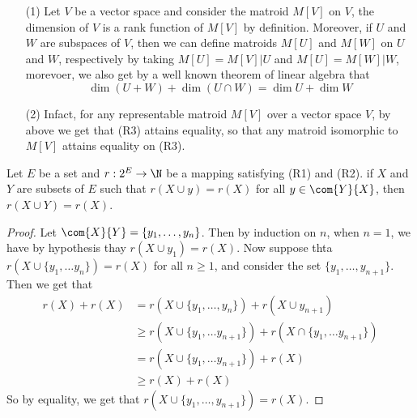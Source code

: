 \begin{example}\label{1.11}
    \begin{enumerate}
        \item[(1)] Let $V$ be a vector space and consider the matroid $M[V]$ on
            $V$, the dimension of $V$ is a rank function of $M[V]$ by definition.
            Moreover, if $U$ and  $W$ are subspaces of  $V$, then we can define
            matroids  $M[U]$ and $M[W]$ on $U$ and  $W$, respectively by taking
            $M[U]=M[V]|U$ and $M[U]=M[W]|W$, morevoer, we also get by a well
            known theorem of linear algebra that
                \begin{equation*}
                    \dim{(U+W)}+\dim{(U \cap W)}=\dim{U}+\dim{W}
                \end{equation*}

            \item[(2)] Infact, for any representable matroid $M[V]$ over a
                vector space $V$, by above we get that (R3) attains equality, so
                that any matroid isomorphic to $M[V]$ attains equality on (R3).
    \end{enumerate}
\end{example}

\begin{lemma}\label{1.3.2}
    Let $E$ be a set and  $r:2^E \rightarrow \N$ be a mapping satisfying (R1)
    and (R2). if $X$ and  $Y$ are subsets of  $E$ such that  $r(X \cup y)=r(X)$
    for all $y \in \com{Y}{X}$, then $r(X \cup Y)=r(X)$.
\end{lemma}
\begin{proof}
    Let $\com{X}{Y}=\{y_1, \dots, y_n\}$. Then by induction on $n$, when  $n=1$,
    we have by hypothesis thay  $r(X \cup y_1)=r(X)$. Now suppose thta $r(X \cup
    \{y_1, \dots y_n\})=r(X)$ for all $n \geq 1$, and consider the set
    $\{y_1,\dots,y_{n+1}\}$. Then we get that
    \begin{align*}
        r(X)+r(X)   &=  r(X \cup \{y_1, \dots, y_n\})+r(X \cup y_{n+1}) \\
                    & \geq r(X \cup \{y_1, \dots y_{n+1}\})+r(X \cap \{y_1,
                        \dots y_{n+1}\}) \\
                    &= r(X \cup \{y_1, \dots y_{n+1}\})+r(X) \\
                    & \geq r(X)+r(X)
    \end{align*}
    So by equality, we get that $r(X \cup \{y_1, \dots, y_{n+1}\})=r(X)$.
\end{proof}

